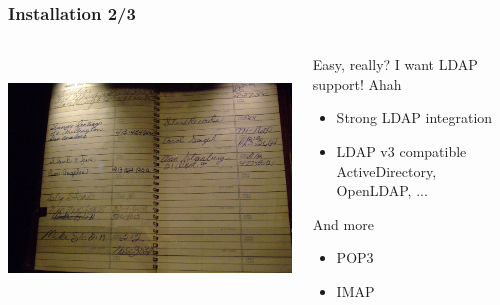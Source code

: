 \documentclass{beamer}
\begin{document}
\begin{frame}
    \frametitle{Installation 2/3}


 \begin{columns}
 \begin{column}{0.34\textwidth}
    \includegraphics[height=6.5cm]{pics/addressbook.jpg}
 \end{column}
 \begin{column}{0.90\textwidth}
    \begin{block}{Easy, really? I want LDAP support! Ahah}
        \begin{itemize}
            \item Strong LDAP integration
            \item LDAP v3 compatible \\
            {\small ActiveDirectory, OpenLDAP, ...}
        \end{itemize}
    \end{block}

    \begin{block}{And more}
        \begin{itemize}
            \item POP3
            \item IMAP
        \end{itemize}
    \end{block}
 \end{column}
\end{columns}
\end{frame}
\end{document}
